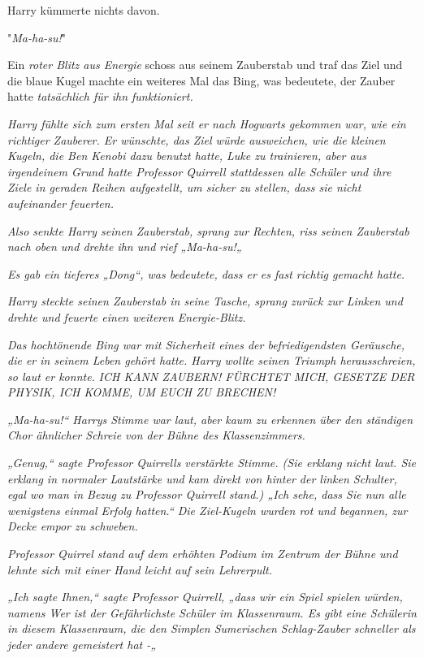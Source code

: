 {Harry kümmerte nichts davon.

"\emph{Ma-ha-su!}"

Ein \emph{roter Blitz aus Energie} schoss aus seinem Zauberstab und traf das Ziel und die blaue Kugel machte ein weiteres Mal das Bing, was bedeutete, der Zauber hatte \emph{tatsächlich für ihn funktioniert.}

\emph{Harry fühlte sich zum ersten Mal seit er nach Hogwarts gekommen war, wie ein richtiger Zauberer. Er wünschte, das Ziel würde ausweichen, wie die kleinen Kugeln, die Ben Kenobi dazu benutzt hatte, Luke zu trainieren, aber aus irgendeinem Grund hatte Professor Quirrell stattdessen alle Schüler und ihre Ziele in geraden Reihen aufgestellt, um sicher zu stellen, dass sie nicht aufeinander feuerten.}

\emph{Also senkte Harry seinen Zauberstab, sprang zur Rechten, riss seinen Zauberstab nach oben und drehte ihn und rief „\emph{Ma-ha-su!}„}

\emph{Es gab ein tieferes „Dong“, was bedeutete, dass er es fast richtig gemacht hatte.}

\emph{Harry steckte seinen Zauberstab in seine Tasche, sprang zurück zur Linken und drehte und feuerte einen weiteren Energie-Blitz.}

\emph{Das hochtönende Bing war mit Sicherheit eines der befriedigendsten Geräusche, die er in seinem Leben gehört hatte. Harry wollte seinen Triumph herausschreien, so laut er konnte.} \emph{\emph{ICH KANN ZAUBERN! FÜRCHTET MICH, GESETZE DER PHYSIK, ICH KOMME, UM EUCH ZU BRECHEN!}}

\emph{„\emph{Ma-ha-su!}“ Harrys Stimme war laut, aber kaum zu erkennen über den ständigen Chor ähnlicher Schreie von der Bühne des Klassenzimmers.}

\emph{„Genug,“ sagte Professor Quirrells verstärkte Stimme. (Sie erklang nicht laut. Sie erklang in normaler Lautstärke und kam direkt von hinter der linken Schulter, egal wo man in Bezug zu Professor Quirrell stand.) „Ich sehe, dass Sie nun alle wenigstens einmal Erfolg hatten.“ Die Ziel-Kugeln wurden rot und begannen, zur Decke empor zu schweben.}

\emph{Professor Quirrel stand auf dem erhöhten Podium im Zentrum der Bühne und lehnte sich mit einer Hand leicht auf sein Lehrerpult.}

\emph{„Ich sagte Ihnen,“ sagte Professor Quirrell, „dass wir ein Spiel spielen würden, namens Wer ist der Gefährlichste Schüler im Klassenraum. Es gibt eine Schülerin in diesem Klassenraum, die den Simplen Sumerischen Schlag-Zauber schneller als jeder andere gemeistert hat -„}

}
